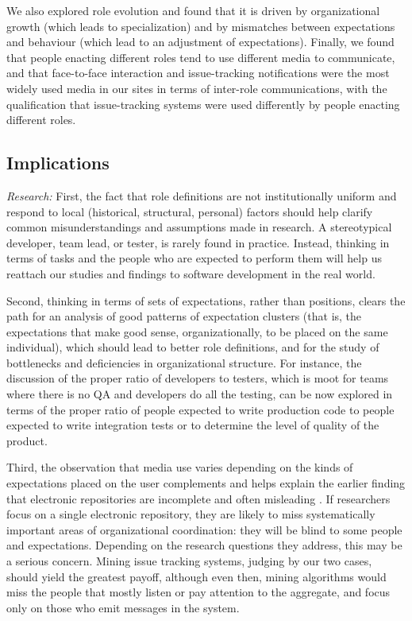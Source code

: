 \documentclass[10pt, conference, compsocconf]{IEEEtran}
\begin{document}
We also explored role evolution and found that it is driven by organizational growth (which leads to specialization) and by mismatches between expectations and behaviour (which lead to an adjustment of expectations). Finally, we found that people enacting different roles tend to use different media to communicate, and that face-to-face interaction and issue-tracking notifications were the most widely used media in our sites in terms of inter-role communications, with the qualification that issue-tracking systems were used differently by people enacting different roles.


\subsection{Implications}

\emph{Research:} First, the fact that role definitions are not institutionally uniform and respond to local (historical, structural, personal) factors should help clarify common misunderstandings and assumptions made in research. A stereotypical developer, team lead, or tester, is rarely found in practice. Instead, thinking in terms of tasks and the people who are expected to perform them will help us reattach our studies and findings to software development in the real world.

Second, thinking in terms of sets of expectations, rather than positions, clears the path for an analysis of good patterns of expectation clusters (that is, the expectations that make good sense, organizationally, to be placed on the same individual), which should lead to better role definitions, and for the study of bottlenecks and deficiencies in organizational structure. For instance, the discussion of the proper ratio of developers to testers, which is moot for teams where there is no QA and developers do all the testing, can be now explored in terms of the proper ratio of people expected to write production code to people expected to write integration tests or to determine the level of quality of the product.

Third, the observation that media use varies depending on the kinds of expectations placed on the user complements and helps explain the earlier finding that electronic repositories are incomplete and often misleading \cite{Aranda2009}. If researchers focus on a single electronic repository, they are likely to miss systematically important areas of organizational coordination: they will be blind to some people and expectations. Depending on the research questions they address, this may be a serious concern. Mining issue tracking systems, judging by our two cases, should yield the greatest payoff, although even then, mining algorithms would miss the people that mostly listen or pay attention to the aggregate, and focus only on those who emit messages in the system.
\end{document}
